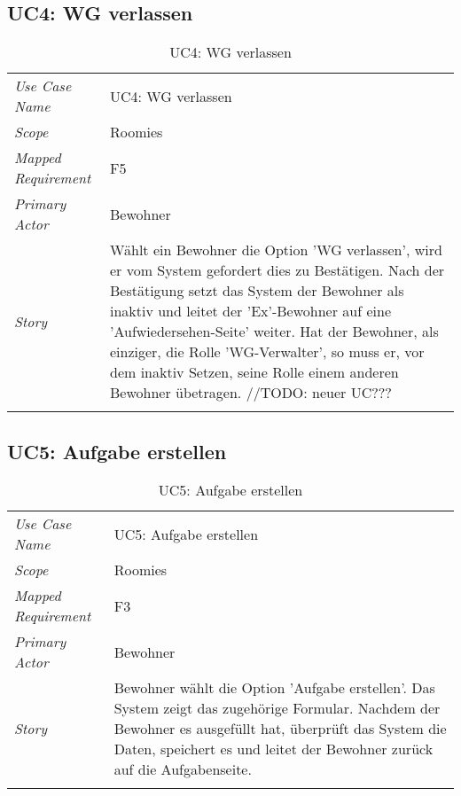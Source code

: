 \subsection{UC4: WG verlassen}
\begin{table}[H]
	\tablestyle
	\tablealtcolored
	\begin{tabularx}{\textwidth}{lX}
		\tablebody
			\textit{Use Case Name} &
			UC4: WG verlassen
			\tabularnewline
			\textit{Scope} &
			Roomies
			\tabularnewline
			\textit{Mapped Requirement} &
			F5
			\tabularnewline
			\textit{Primary Actor} &
			Bewohner
			\tabularnewline
			\textit{Story} &
			Wählt ein Bewohner die Option 'WG verlassen', wird er vom System gefordert dies zu Bestätigen. Nach der Bestätigung setzt das System der Bewohner als inaktiv und leitet der 'Ex'-Bewohner auf eine 'Aufwiedersehen-Seite' weiter. \newline
			Hat der Bewohner, als einziger, die Rolle 'WG-Verwalter', so muss er, vor dem inaktiv Setzen, seine Rolle einem anderen Bewohner übetragen. \newline//TODO: neuer UC???
			\tabularnewline
		\tableend
	\end{tabularx}
	\caption{UC4: WG verlassen}
\end{table}


\subsection{UC5: Aufgabe erstellen}
\begin{table}[H]
	\tablestyle
	\tablealtcolored
	\begin{tabularx}{\textwidth}{lX}
		\tablebody
			\textit{Use Case Name} &
			UC5: Aufgabe erstellen
			\tabularnewline
			\textit{Scope} &
			Roomies
			\tabularnewline
			\textit{Mapped Requirement} &
			F3
			\tabularnewline
			\textit{Primary Actor} &
			Bewohner
			\tabularnewline
			\textit{Story} &
			Bewohner wählt die Option 'Aufgabe erstellen'. Das System zeigt das zugehörige Formular. Nachdem der Bewohner es ausgefüllt hat, überprüft das System die Daten, speichert es und leitet der Bewohner zurück auf die Aufgabenseite.
			\tabularnewline
		\tableend
	\end{tabularx}
	\caption{UC5: Aufgabe erstellen}
\end{table}


